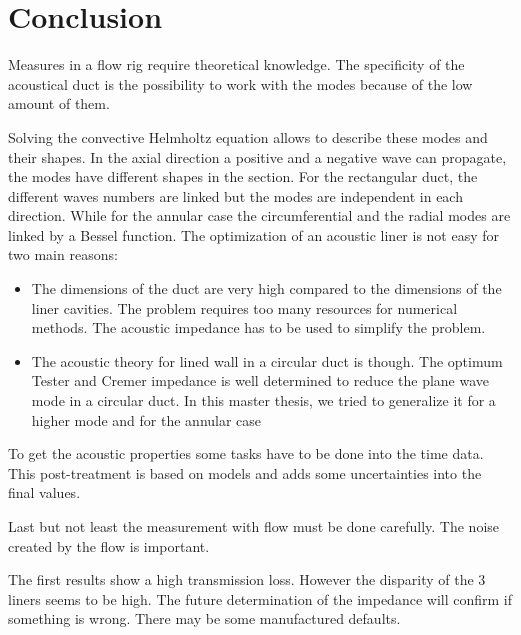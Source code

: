 \section{Conclusion}
\setlength{\parindent}{20pt}
 \indent Measures in a flow rig require theoretical knowledge. The specificity of the acoustical duct is the possibility to work with the modes because of the low amount of them. 
 
 Solving the convective Helmholtz equation allows to describe these modes and their shapes. In the axial direction a positive and a negative wave can propagate, the modes have different shapes in the section. For the rectangular duct, the different waves numbers are linked but the modes are independent in each direction. While for the annular case the circumferential and the radial modes are linked by a Bessel function.
The optimization of an acoustic liner is not easy for two main reasons: 
\begin{itemize}
    \item The dimensions of the duct are very high compared to the dimensions of the liner cavities. The problem requires too many resources for numerical methods. The acoustic impedance has to be used to simplify the problem.
    \item The acoustic theory for lined wall in a circular duct is though. The optimum Tester and Cremer impedance is well determined to reduce the plane wave mode in a circular duct. In this master thesis, we tried to generalize it for a higher mode and for the annular case 
\end{itemize}
\indent To get the acoustic properties some tasks have to be done into the time data. This post-treatment is based on models and adds some uncertainties into the final values.

Last but not least the measurement with flow must be done carefully. The noise created by the flow is important.

The first results show a high transmission loss. However the disparity of the 3 liners seems to be high. The future determination of the impedance will confirm if something is wrong. There may be some manufactured defaults.
\clearpage

